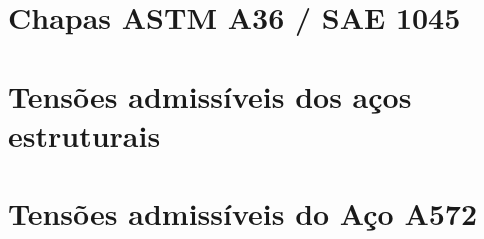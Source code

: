 \section{Chapas ASTM A36 / SAE 1045}


\section{Tensões admissíveis dos aços estruturais}
\label{sec:tensoes_admissiveis_dos_acos_estruturais}


\section{Tensões admissíveis do Aço A572}

